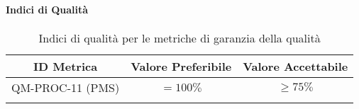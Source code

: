 	
	\paragraph{Indici di Qualità}
	
	\begin{center}
		\begin{longtable}{|c|c|c|}
			\hline
			\rowcolor{lighter-grayer}
			\textbf{ID Metrica} & \textbf{Valore Preferibile} & \textbf{Valore Accettabile}\\
			\hline
			\endfirsthead
			\hline
			QM-PROC-11 (PMS) & \(= 100\%\) & \(\geq 75\%\) \\ \hline
			\hline
			\caption{Indici di qualità per le metriche di garanzia della qualità}
		\end{longtable}
	\end{center}